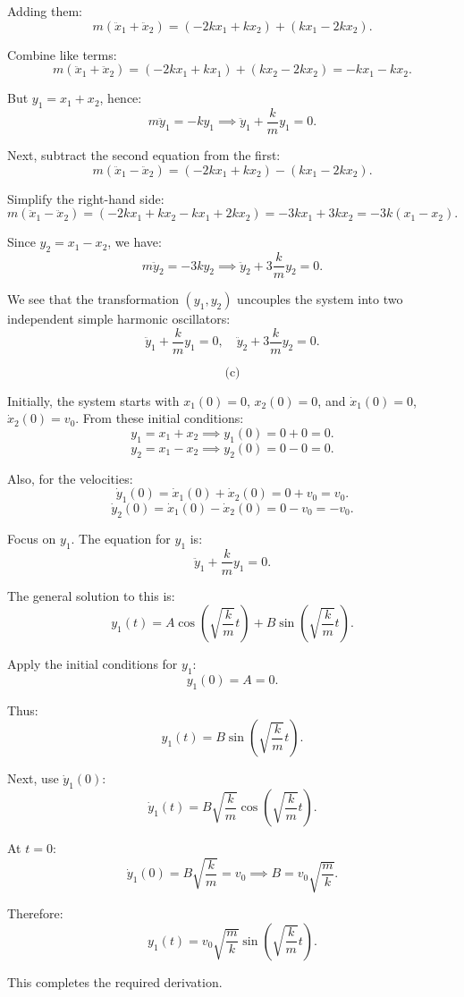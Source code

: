 \documentclass{article}
\begin{document}
Adding them:
\[
m(\ddot{x}_1 + \ddot{x}_2) = (-2k x_1 + k x_2) + (k x_1 - 2k x_2).
\]

Combine like terms:
\[
m(\ddot{x}_1 + \ddot{x}_2) = (-2k x_1 + k x_1) + (k x_2 - 2k x_2) = -k x_1 - k x_2.
\]

But $y_1 = x_1 + x_2$, hence:
\[
m \ddot{y}_1 = -k y_1 \implies \ddot{y}_1 + \frac{k}{m} y_1 = 0.
\]

Next, subtract the second equation from the first:
\[
m(\ddot{x}_1 - \ddot{x}_2) = (-2k x_1 + k x_2) - (k x_1 - 2k x_2).
\]

Simplify the right-hand side:
\[
m(\ddot{x}_1 - \ddot{x}_2) = (-2k x_1 + k x_2 - k x_1 + 2k x_2) = -3k x_1 + 3k x_2 = -3k(x_1 - x_2).
\]

Since $y_2 = x_1 - x_2$, we have:
\[
m \ddot{y}_2 = -3k y_2 \implies \ddot{y}_2 + 3\frac{k}{m} y_2 = 0.
\]

We see that the transformation $(y_1, y_2)$ uncouples the system into two independent simple harmonic oscillators:
\[
\ddot{y}_1 + \frac{k}{m}y_1 = 0, \quad \ddot{y}_2 + 3\frac{k}{m}y_2 = 0.
\]

\[
\text{(c)}
\]

Initially, the system starts with $x_1(0)=0$, $x_2(0)=0$, and $\dot{x}_1(0)=0$, $\dot{x}_2(0)=v_0$. From these initial conditions:
\[
y_1 = x_1 + x_2 \implies y_1(0) = 0 + 0 = 0.
\]
\[
y_2 = x_1 - x_2 \implies y_2(0) = 0 - 0 = 0.
\]

Also, for the velocities:
\[
\dot{y}_1(0) = \dot{x}_1(0) + \dot{x}_2(0) = 0 + v_0 = v_0.
\]
\[
\dot{y}_2(0) = \dot{x}_1(0) - \dot{x}_2(0) = 0 - v_0 = -v_0.
\]

Focus on $y_1$. The equation for $y_1$ is:
\[
\ddot{y}_1 + \frac{k}{m}y_1 = 0.
\]

The general solution to this is:
\[
y_1(t) = A \cos\left(\sqrt{\frac{k}{m}}t\right) + B \sin\left(\sqrt{\frac{k}{m}}t\right).
\]

Apply the initial conditions for $y_1$:
\[
y_1(0) = A = 0.
\]

Thus:
\[
y_1(t) = B \sin\left(\sqrt{\frac{k}{m}}t\right).
\]

Next, use $\dot{y}_1(0)$:
\[
\dot{y}_1(t) = B \sqrt{\frac{k}{m}}\cos\left(\sqrt{\frac{k}{m}}t\right).
\]

At $t=0$:
\[
\dot{y}_1(0) = B \sqrt{\frac{k}{m}} = v_0 \implies B = v_0 \sqrt{\frac{m}{k}}.
\]

Therefore:
\[
y_1(t) = v_0 \sqrt{\frac{m}{k}} \sin\left(\sqrt{\frac{k}{m}}t\right).
\]

This completes the required derivation.
\end{document}
